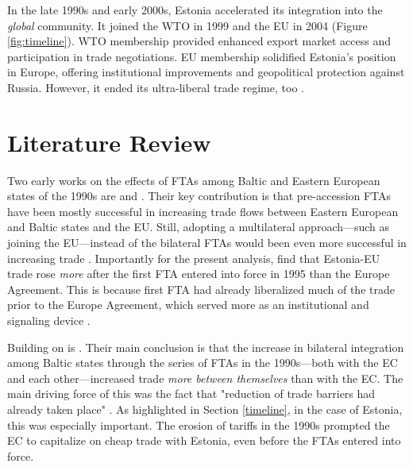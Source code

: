 \documentclass[a4paper,10pt]{article}
\begin{document}
In the late 1990s and early 2000s, Estonia accelerated its integration into the \textit{global} community. It joined the WTO in 1999 and the EU in 2004 (Figure \ref{fig:timeline}). WTO membership provided enhanced export market access and participation in trade negotiations. EU membership solidified Estonia's position in Europe, offering institutional improvements and geopolitical protection against Russia. However, it ended its ultra-liberal trade regime, too \citep{feldmann_soviet_2002,varblane_impact_2002}.

\section{Literature Review} \label{literature}

Two early works on the effects of FTAs among Baltic and Eastern European states of the 1990s are \cite{adam_trade_2003} and \cite{martin_trade_2003}. Their key contribution is that pre-accession FTAs have been mostly successful in increasing trade flows between Eastern European and Baltic states and the EU. Still, adopting a multilateral approach---such as joining the EU---instead of the bilateral FTAs would been even more successful in increasing trade \citep{adam_trade_2003}. Importantly for the present analysis, \cite{adam_trade_2003} find that Estonia-EU trade rose \textit{more} after the first FTA entered into force in 1995 than the Europe Agreement. This is because first FTA had already liberalized much of the trade prior to the Europe Agreement, which served more as an institutional and signaling device \citep{soete_dissecting_2017}.

Building on \cite{adam_trade_2003} is \cite{benedictis_hub-and-spoke_2005}. Their main conclusion is that the increase in bilateral integration among Baltic states through the series of FTAs in the 1990s---both with the EC and each other---increased trade \textit{more between themselves} than with the EC. The main driving force of this was the fact that "reduction of trade barriers had already taken place" \citep{benedictis_hub-and-spoke_2005}. As highlighted in Section \ref{timeline}, in the case of Estonia, this was especially important. The erosion of tariffs in the 1990s prompted the EC to capitalize on cheap trade with Estonia, even before the FTAs entered into force.
\end{document}
